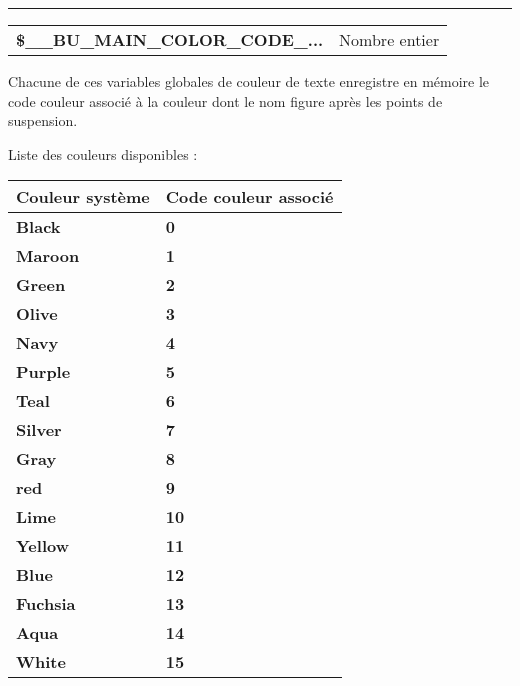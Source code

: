 \documentclass[a4paper,10pt]{article}
\begin{document}
\par\noindent\rule{\textwidth}{0.4pt}

\begin{justify}
    \begin{tabular}{l|l}
        \textbf{\color{vars}\$\_\_BU\_MAIN\_COLOR\_CODE\_...}  & Nombre entier\\
    \end{tabular}
\end{justify}

\begin{justify}
    Chacune de ces variables globales de couleur de texte enregistre en mémoire le code couleur associé à la couleur dont le nom figure après les points de suspension.
\end{justify}

\begin{justify}
    Liste des couleurs disponibles :

    \begin{tabular}{|l|l|}
        \hline
        \textbf{Couleur système} & \textbf{Code couleur associé}\\
        \hline
        \textbf{\color{text}Black} & \textbf{\color{text}0}\\
        \hline
        \textbf{\color{Maroon}Maroon} & \textbf{\color{Maroon}1}\\
        \hline
        \textbf{\color{Green}Green} & \textbf{\color{Green}2}\\
        \hline
        \textbf{\color{Olive}Olive} & \textbf{\color{Olive}3}\\
        \hline
        \textbf{\color{Navy}Navy} & \textbf{\color{Navy}4}\\
        \hline
        \textbf{\color{Purple}Purple} & \textbf{\color{Purple}5}\\
        \hline
        \textbf{\color{Teal}Teal} & \textbf{\color{Teal}6}\\
        \hline
        \textbf{\color{Silver}Silver} & \textbf{\color{Silver}7}\\
        \hline
        \textbf{\color{Gray}Gray} & \textbf{\color{Gray}8}\\
        \hline
        \textbf{\color{Red}red} & \textbf{\color{Red}9}\\
        \hline
        \textbf{\color{Lime}Lime} & \textbf{\color{Lime}10}\\
        \hline
        \textbf{\color{Yellow}Yellow} & \textbf{\color{Yellow}11}\\
        \hline
        \textbf{\color{Blue}Blue} & \textbf{\color{Blue}12}\\
        \hline
        \textbf{\color{Fuchsia}Fuchsia} & \textbf{\color{Fuchsia}13}\\
        \hline
        \textbf{\color{Aqua}Aqua} & \textbf{\color{Aqua}14}\\
        \hline
        \textbf{\color{text}White} & \textbf{\color{text}15}\\
        \hline
    \end{tabular}


\end{justify}
\end{document}

